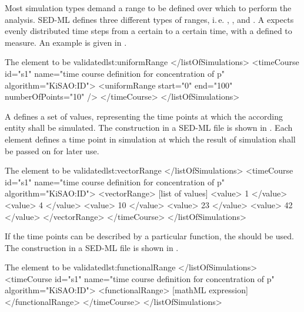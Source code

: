 \label{sec:range}
Most simulation types demand a range to be defined over which to perform the analysis. SED-ML defines three different types of ranges, i.\,e. , , and .
A  expects evenly distributed time steps from a certain  to a certain  time, with a defined  to measure. An example is given in . %
\begin{myXmlLst}{The  element \alert{to be validated}}{lst:uniformRange}
</listOfSimulations>
 <timeCourse id="s1" name="time course definition for concentration of p" algorithm="KiSAO:ID">
  <uniformRange start="0" end="100" numberOfPoints="10" />
 </timeCourse>
</listOfSimulations>
\end{myXmlLst}


A  defines a set of values, representing the time points at which the according entity shall be simulated. %
The construction in a SED-ML file is shown in . Each  element defines a time point in simulation at which the result of simulation shall be passed on for later use.
%
\begin{myXmlLst}{The  element \alert{to be validated}}{lst:vectorRange}
</listOfSimulations>
 <timeCourse id="s1" name="time course definition for concentration of p" algorithm="KiSAO:ID">
  <vectorRange>
   [list of values]
   <value> 1  </value>
   <value> 4  </value>  
   <value> 10 </value>
   <value> 23 </value>
   <value> 42 </value>
  </vectorRange>
 </timeCourse>
</listOfSimulations>
\end{myXmlLst}

If the time points can be described by a particular function, the  should be used. The construction in a SED-ML file is shown in .
\begin{myXmlLst}{The  element \alert{to be validated}}{lst:functionalRange}
</listOfSimulations>
 <timeCourse id="s1" name="time course definition for concentration of p" algorithm="KiSAO:ID">
  <functionalRange>
    [mathML expression]
  </functionalRange>
 </timeCourse>
</listOfSimulations>
\end{myXmlLst}


